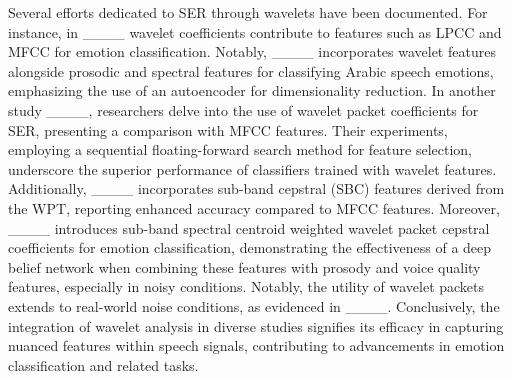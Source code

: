 Several efforts dedicated to SER through wavelets have been documented. For instance, in ____ wavelet coefficients contribute to features such as LPCC and MFCC for emotion classification. Notably, ____ incorporates wavelet features alongside prosodic and spectral features for classifying Arabic speech emotions, emphasizing the use of an autoencoder for dimensionality reduction. In another study ____, researchers delve into the use of wavelet packet coefficients for SER, presenting a comparison with MFCC features. Their experiments, employing a sequential floating-forward search method for feature selection, underscore the superior performance of classifiers trained with wavelet features. Additionally, ____ incorporates sub-band cepstral (SBC) features derived from the WPT, reporting enhanced accuracy compared to MFCC features. Moreover, ____ introduces sub-band spectral centroid weighted wavelet packet cepstral coefficients for emotion classification, demonstrating the effectiveness of a deep belief network when combining these features with prosody and voice quality features, especially in noisy conditions. Notably, the utility of wavelet packets extends to real-world noise conditions, as evidenced in ____. Conclusively, the integration of wavelet analysis in diverse studies signifies its efficacy in capturing nuanced features within speech signals, contributing to advancements in emotion classification and related tasks.